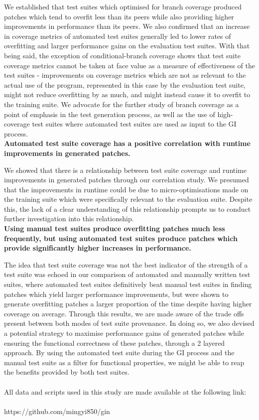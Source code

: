 \documentclass[titlepage]{article}
\begin{document}
We established that test suites which optimised for branch coverage produced patches which tend to overfit less than its peers while also providing higher improvements in performance than its peers. We also confirmed that an increase in coverage metrics of automated test suites generally led to lower rates of overfitting and larger performance gains on the evaluation test suites. With that being said, the exception of conditional-branch coverage shows that test suite coverage metrics cannot be taken at face value as a measure of effectiveness of the test suites - improvements on coverage metrics which are not as relevant to the actual use of the program, represented in this case by the evaluation test suite, might not reduce overfitting by as much, and might instead cause it to overfit to the training suite. We advocate for the further study of branch coverage as a point of emphasis in the test generation process, as well as the use of high-coverage test suites where automated test suites are used as input to the GI process. \\

\textbf{Automated test suite coverage has a positive correlation with runtime improvements in generated patches.} 
	
We showed that there is a relationship between test suite coverage and runtime improvements in generated patches through our correlation study. We presumed that the improvements in runtime could be due to micro-optimisations made on the training suite which were specifically relevant to the evaluation suite. Despite this, the lack of a clear understanding of this relationship prompts us to conduct further investigation into this relationship.  \\

\textbf{Using manual test suites produce overfitting patches much less frequently, but using automated test suites produce patches which provide significantly higher increases in performance.} 
	
The idea that test suite coverage was not the best indicator of the strength of a test suite was echoed in our comparison of automated and manually written test suites, where automated test suites definitively beat manual test suites in finding patches which yield larger performance improvements, but were shown to generate overfitting patches a larger proportion of the time despite having higher coverage on average. Through this results, we are made aware of the trade offs present between both modes of test suite provenance. In doing so, we also devised a potential strategy to maximise performance gains of generated patches while ensuring the functional correctness of these patches, through a 2 layered approach. By using the automated test suite during the GI process and the manual test suite as a filter for functional properties, we might be able to reap the benefits provided by both test suites. \\\\
All data and scripts used in this study are made available at the following link:\\\\
https://github.com/mingyi850/gin
\end{document}

